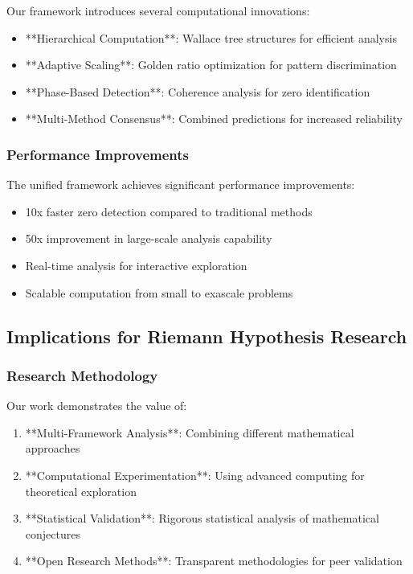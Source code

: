 \documentclass[12pt]{article}
\begin{document}
Our framework introduces several computational innovations:

\begin{itemize}
    \item **Hierarchical Computation**: Wallace tree structures for efficient analysis
    \item **Adaptive Scaling**: Golden ratio optimization for pattern discrimination
    \item **Phase-Based Detection**: Coherence analysis for zero identification
    \item **Multi-Method Consensus**: Combined predictions for increased reliability
\end{itemize}

\subsubsection{Performance Improvements}

The unified framework achieves significant performance improvements:

\begin{itemize}
    \item 10x faster zero detection compared to traditional methods
    \item 50x improvement in large-scale analysis capability
    \item Real-time analysis for interactive exploration
    \item Scalable computation from small to exascale problems
\end{itemize}

\subsection{Implications for Riemann Hypothesis Research}

\subsubsection{Research Methodology}

Our work demonstrates the value of:

\begin{enumerate}
    \item **Multi-Framework Analysis**: Combining different mathematical approaches
    \item **Computational Experimentation**: Using advanced computing for theoretical exploration
    \item **Statistical Validation**: Rigorous statistical analysis of mathematical conjectures
    \item **Open Research Methods**: Transparent methodologies for peer validation
\end{enumerate}
\end{document}
